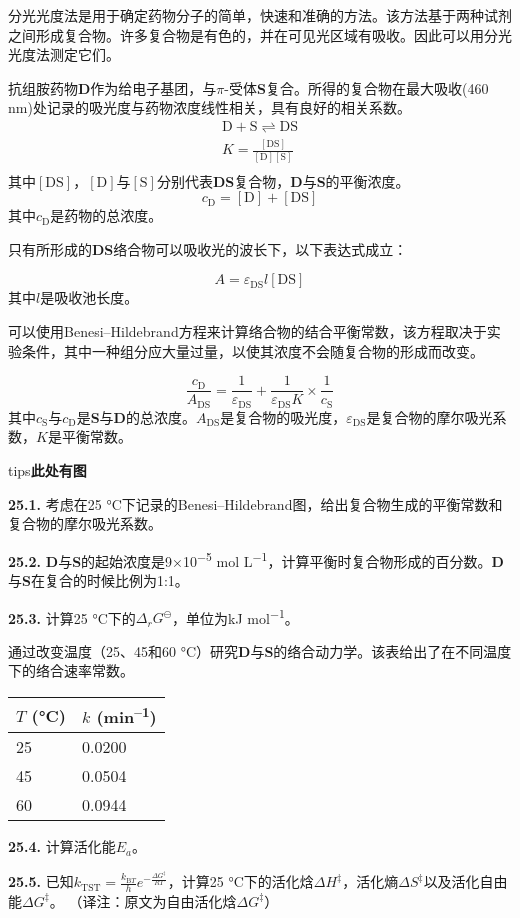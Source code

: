 
分光光度法是用于确定药物分子的简单，快速和准确的方法。该方法基于两种试剂之间形成复合物。许多复合物是有色的，并在可见光区域有吸收。因此可以用分光光度法测定它们。

抗组胺药物\textbf{D}作为给电子基团，与$\pi$-受体\textbf{S}复合。所得的复合物在最大吸收(460 nm)处记录的吸光度与药物浓度线性相关，具有良好的相关系数。
$$
\begin{aligned}
\mathrm D+\mathrm S\rightleftharpoons\mathrm {DS}\\
K=\frac{[\mathrm{DS}]}{[\mathrm D][\mathrm S]}\\
\end{aligned}
$$
其中\([\mathrm{DS}]\)，\([\mathrm D]\)与\([\mathrm S]\)分别代表\textbf{DS}复合物，\textbf{D}与\textbf{S}的平衡浓度。
\[
c_{\mathrm D}=[\mathrm D]+[\mathrm {DS}]
\] 
其中\(c_{\mathrm D}\)是药物的总浓度。

只有所形成的\textbf{DS}络合物可以吸收光的波长下，以下表达式成立：

 \[
A=\varepsilon_{\mathrm{DS}}l[\mathrm{DS}]
\] 
其中\(l\)是吸收池长度。

可以使用Benesi--Hildebrand方程来计算络合物的结合平衡常数，该方程取决于实验条件，其中一种组分应大量过量，以使其浓度不会随复合物的形成而改变。

\[
\frac{c_{\mathrm D}}{A_{\mathrm{DS}}}=\frac{1}{\varepsilon_{\mathrm{DS}}}+\frac{1}{\varepsilon_{\mathrm{DS}}K}\times\frac{1}{c_{\mathrm S}}
\]
其中\(c_{\mathrm S}\)与\(c_{\mathrm D}\)是\textbf{S}与\textbf{D}的总浓度。\(A_{\mathrm{DS}}\)是复合物的吸光度，\(\varepsilon_{\mathrm{DS}}\)是复合物的摩尔吸光系数，\(K\)是平衡常数。

tips\textbf{此处有图}

\noindent\textbf{25.1.} 考虑在25
°C下记录的Benesi--Hildebrand图，给出复合物生成的平衡常数和复合物的摩尔吸光系数。


\noindent\textbf{25.2.}
\textbf{D}与\textbf{S}的起始浓度是9×10\textsuperscript{−5} mol
L\textsuperscript{−1}，计算平衡时复合物形成的百分数。\textbf{D}与\textbf{S}在复合的时候比例为1:1。

\noindent\textbf{25.3.} 计算25 °C下的\(\Delta_rG^\ominus\)，单位为kJ
mol\textsuperscript{−1}。

通过改变温度（25、45和60 °C）研究\textbf{D}与\textbf{S}的络合动力学。该表给出了在不同温度下的络合速率常数。

\begin{longtable}[]{@{}ll@{}}
	\toprule
	$T$ (°C) & $k$ (min\textsuperscript{--1})\tabularnewline
	\midrule
	\endhead
	25 & 0.0200\tabularnewline
	45 & 0.0504\tabularnewline
	60 & 0.0944\tabularnewline
	\bottomrule
\end{longtable}

\noindent\textbf{25.4.} 计算活化能\(E_a\)。

\noindent\textbf{25.5.}
已知\(k_{\mathrm{TST}}=\frac{k_{\mathrm BT}}{h}e^{-\frac{\Delta G^\ddag}{RT}}\)，计算25 °C下的活化焓\(\Delta H^\ddag\)，活化熵\(\Delta S^\ddag\)以及活化自由能\(\Delta G^\ddag\)。
（译注：原文为自由活化焓\(\Delta G^\ddag\)）
